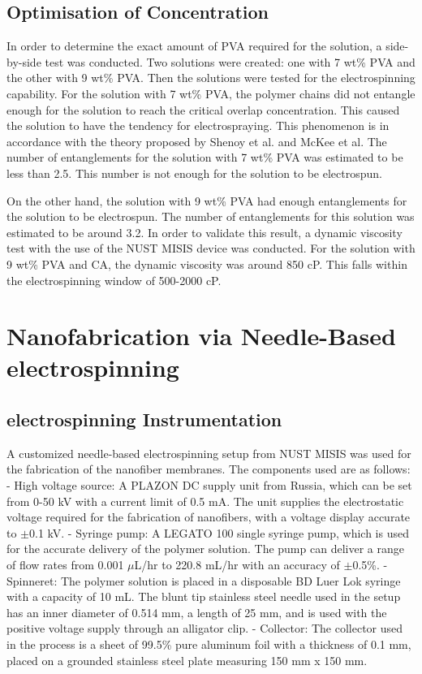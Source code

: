 \documentclass[12pt,a4paper]{report}
\begin{document}
\subsection{Optimisation of Concentration}
In order to determine the exact amount of PVA required for the solution, a side-by-side test was conducted. Two solutions were created: one with 7 wt\% PVA and the other with 9 wt\% PVA. Then the solutions were tested for the electrospinning capability. For the solution with 7 wt\% PVA, the polymer chains did not entangle enough for the solution to reach the critical overlap concentration. This caused the solution to have the tendency for electrospraying. This phenomenon is in accordance with the theory proposed by Shenoy et al.\cite{44} and McKee et al.\cite{45} The number of entanglements for the solution with 7 wt\% PVA was estimated to be less than 2.5. This number is not enough for the solution to be electrospun.

On the other hand, the solution with 9 wt\% PVA had enough entanglements for the solution to be electrospun. The number of entanglements for this solution was estimated to be around 3.2. In order to validate this result, a dynamic viscosity test with the use of the NUST MISIS device was conducted. For the solution with 9 wt\% PVA and CA, the dynamic viscosity was around 850 cP. This falls within the electrospinning window of 500-2000 cP.\cite{46,47}

\section{Nanofabrication via Needle-Based electrospinning}
\subsection{electrospinning Instrumentation}
A customized needle-based electrospinning setup from NUST MISIS was used for the fabrication of the nanofiber membranes. The components used are as follows:
- High voltage source: A PLAZON DC supply unit from Russia, which can be set from 0-50 kV with a current limit of 0.5 mA. The unit supplies the electrostatic voltage required for the fabrication of nanofibers, with a voltage display accurate to \(\pm\)0.1 kV.
- Syringe pump: A LEGATO 100 single syringe pump, which is used for the accurate delivery of the polymer solution. The pump can deliver a range of flow rates from 0.001 \(\mu\)L/hr to 220.8 mL/hr with an accuracy of \(\pm\)0.5\%.
- Spinneret: The polymer solution is placed in a disposable BD Luer Lok syringe with a capacity of 10 mL. The blunt tip stainless steel needle used in the setup has an inner diameter of 0.514 mm, a length of 25 mm, and is used with the positive voltage supply through an alligator clip.
- Collector: The collector used in the process is a sheet of 99.5\% pure aluminum foil with a thickness of 0.1 mm, placed on a grounded stainless steel plate measuring 150 mm x 150 mm.
\end{document}
